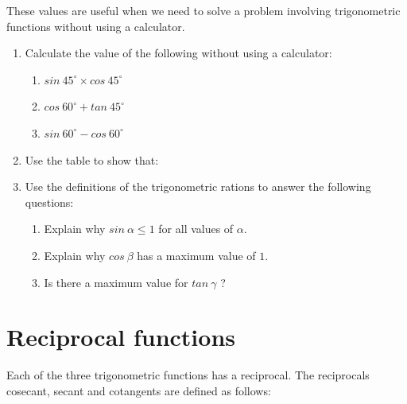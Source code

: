 \par
These values are useful when we need to solve a problem involving trigonometric functions without using a calculator.\par 
\begin{exercises}{}
{
\begin{enumerate}[itemsep=6pt, label=\textbf{\arabic*}. ] 
\item Calculate the value of the following without using a calculator:
\begin{enumerate}[noitemsep, label=\textbf{(\alph*)} ]
\item $sin~45^{\circ} \times cos~45^{\circ}$
\item $cos~60^{\circ} + tan~45^{\circ}$
\item $sin~60^{\circ} - cos~60^{\circ}$
\end{enumerate}

\item Use the table to  show that:
\begin{enumerate}[itemsep=5pt, label=\textbf{(\alph*)} ]
\item $\dfrac{sin~60^{\circ}}{cos~60^{\circ}} = tan~60^{\circ} $
\item $sin^{2}~45^{\circ}+ cos^{2}~45^{\circ} =1 $
\item $cos~30^{\circ} =\sqrt{1- sin^{2}~30^{\circ}$
\end{enumerate}

\item Use the definitions of the trigonometric rations to answer the following questions:
\begin{enumerate}[noitemsep, label=\textbf{(\alph*)} ]
\item Explain why $sin~\alpha \leq 1$ for all values of $\alpha$.
\item Explain why $cos~\beta$ has a maximum value of $1$.
\item Is there a maximum value for $tan~\gamma$ ?
\end{enumerate}
\end{enumerate}
}
\end{exercises}


\section{Reciprocal functions}
Each of the three trigonometric functions has a reciprocal. The reciprocals cosecant, secant and cotangents are defined as follows:

